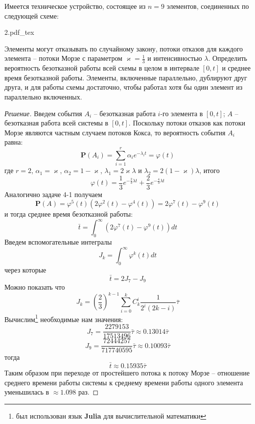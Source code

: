 \documentclass[12pt,a4paper]{article}
\newcommand{\incfig}[1]{%
	\def\svgwidth{\columnwidth}
	{#1.pdf_tex}
}
\newcommand{\pP}{\mathbf{P}}
\begin{document}
\begin{exercise}[Задача 4-3]
	Имеется техническое устройство, состоящее из $n = 9$ элементов, соединенных по следующей схеме:
	
	\incfig{2}
	
	Элементы могут отказывать по случайному закону, потоки отказов для каждого элемента -- потоки Морзе с параметром $\varkappa = \frac{1}{3}$ и интенсивностью $\lambda$. Определить вероятность безотказной работы всей схемы в целом в интервале $[0, t]$ и среднее время безотказной работы. Элементы, включенные параллельно, дублируют друг друга, и для работы схемы достаточно, чтобы работал хотя бы один элемент из параллельно включенных.
\end{exercise}
\begin{proof}[Решение]
	Введем события $A_i$ -- безотказная работа $i$-го элемента в $[0, t]$; $A$ -- безотказная работа всей системы в $[0, t]$. Поскольку потоки отказов как потоки Морзе являются частным случаем потоков Кокса, то вероятность события $A_i$ равна:
	$$\pP(A_i) = \sum_{i=1}^{r}{\alpha_i e^{-\lambda_i t}} = \varphi(t)$$
	где $r = 2$, $\alpha_1 = \varkappa$, $\alpha_2 = 1 - \varkappa$, $\lambda_1 = 2\varkappa\lambda$ и $\lambda_2 = 2(1- \varkappa)\lambda$, итого
	$$\varphi(t) = \frac{1}{3}e^{-\frac{2}{3} \lambda t} + \frac{2}{3}e^{-\frac{4}{3} \lambda t}$$
	Аналогично задаче 4-1 получаем
	$$\pP(A) = \varphi^5 (t) (2 \varphi^2 (t) - \varphi^4 (t)) = 2 \varphi^7 (t) - \varphi^9 (t)$$
	и тогда среднее время безотказной работы:
	$$\bar{t} = \int_{0}^{\infty}{(2\varphi^7 (t) - \varphi^9 (t)) dt}$$
	Введем вспомогательные интегралы
	$$J_k = \int_{0}^{\infty}{\varphi^k(t) dt}$$
	через которые
	$$\bar{t} = 2J_7 - J_9$$
	Можно показать что
	$$J_k = \left(\frac{2}{3}\right)^{k-1} \sum_{i=0}^{k}{C_k^i \frac{1}{2^i (2k - i)}} \bar{\tau}$$
	Вычислим\footnote{был использован язык \textbf{Julia} для вычислительной математики} необходимые нам значения:
	$$J_7 = \frac{2279153}{17513496}\bar{\tau} \approx 0.13014\bar{\tau}$$
	$$J_9 = \frac{72444257}{717740595}\bar{\tau} \approx 0.10093\bar{\tau}$$
	тогда
	$$\bar{t} \approx 0.15935\bar{\tau}$$
	Таким образом при переходе от простейшего потока к потоку Морзе -- отношение среднего времени работы системы к среднему времени работы одного элемента уменьшилась в $\approx 1.098$ раз.
	
\end{proof}
\end{document}

